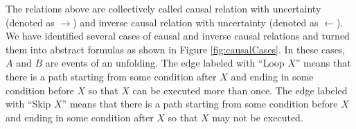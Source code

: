 \documentclass[dvips,...]{llncs}
\begin{document}
The relations above are collectively called causal relation with uncertainty (denoted as $\rightarrow$) and inverse causal relation with uncertainty (denoted as $\leftarrow $). We have identified several cases of causal and inverse causal relations and turned them into abstract formulas as shown in Figure \ref{fig:causalCases}. In these cases, $A$ and $B$ are events of an unfolding. The edge labeled with ``Loop $X$'' means that there is a path starting from some condition after $X$ and ending in some condition before $X$ so that $X$ can be executed more than once. The edge labeled with ``Skip $X$'' means that there is a path starting from some condition before $X$ and ending in some condition after $X$ so that $X$ may not be executed. %
\end{document}
